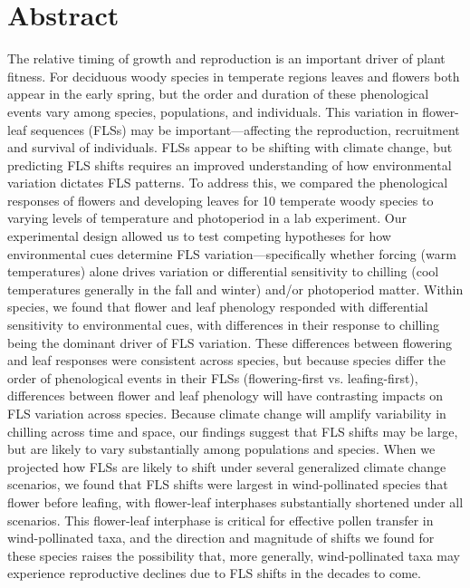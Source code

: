 \documentclass[12pt]{article}\usepackage[]{graphicx}\usepackage[]{color}
\begin{document}
\section*{Abstract} 
The relative timing of growth and reproduction is an important driver of plant fitness. For deciduous woody species in temperate regions leaves and flowers both appear in the early spring, but the order and duration of these phenological events vary among species, populations, and individuals. This variation in flower-leaf sequences (FLSs) may be important---affecting the reproduction, recruitment and survival of individuals. %
FLSs appear to be shifting with climate change,%
 but predicting FLS shifts requires an improved understanding of how environmental variation dictates FLS patterns. To address this, we compared the phenological responses of flowers and developing leaves for 10 temperate woody species to varying levels of temperature and photoperiod in a lab experiment. Our experimental design allowed us to test competing hypotheses for how environmental cues determine FLS variation---specifically whether forcing (warm temperatures) alone drives variation or differential sensitivity to chilling (cool temperatures generally in the fall and winter) and/or photoperiod matter. Within species, we found that flower and leaf phenology responded with differential sensitivity to environmental cues, with differences in their response to chilling being the dominant driver of FLS variation. These differences between flowering and leaf responses were consistent across species, but because species differ the order of phenological events in their FLSs (flowering-first vs. leafing-first), differences between flower and leaf phenology will have contrasting impacts on FLS variation across species. Because climate change will amplify variability in chilling across time and space, our findings suggest that FLS shifts may be large, but are likely to vary substantially among populations and species. When we projected how FLSs are likely to shift under several generalized climate change scenarios, we found that FLS shifts were largest in wind-pollinated species that flower before leafing, with flower-leaf interphases substantially shortened under all scenarios. This flower-leaf interphase is critical for effective pollen transfer in wind-pollinated taxa, and the direction and magnitude of shifts we found for these species raises the possibility that, more generally, wind-pollinated taxa may experience reproductive declines due to FLS shifts in the decades to come.   \\ %
\end{document}

